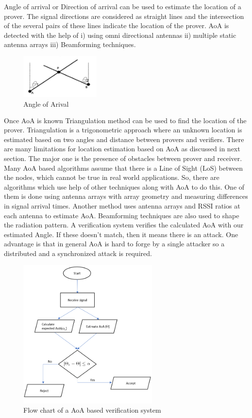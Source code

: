 Angle of arrival or Direction of arrival can be used to estimate the location of a prover. The signal directions are considered as straight lines and the intersection of the several pairs of these lines indicate the location of the prover. AoA is detected with the help of i) using omni directional antennas ii) multiple static antenna arrays iii) Beamforming techniques. 
\begin{figure}[htp]
    \centering
    \includegraphics[width=4cm]{AoA.png}
    \caption{Angle of Arival \cite{angulation}}
    \label{fig:AoA}
\end{figure}
Once AoA is known Triangulation method can be used to find the location of the prover. Triangulation is a trigonometric approach where an unknown location is estimated based on two angles and distance between provers and verifiers. There are many limitations for location estimation based on AoA as discussed in next section. The major one is the presence of obstacles between prover and receiver. Many AoA based algorithms assume that there is a Line of Sight (LoS) between the nodes, which cannot be true in real world applications. So, there are algorithms which use help of other techniques along with AoA to do this. One of them is done using antenna arrays with array geometry and measuring differences in signal arrival times. Another method uses antenna arrays and RSSI ratios at each antenna to estimate AoA. Beamforming techniques are also used to shape the radiation pattern. 
A verification system verifies the calculated AoA with our estimated Angle. If these doesn’t match, then it means there is an attack. One advantage is that in general AoA is hard to forge by a single attacker so a distributed and a synchronized attack is required.

\begin{figure}[htp]
    \centering
    \includegraphics[width=7cm]{aoa_flow.png}
    \caption{Flow chart of a AoA based verification system \cite{abdelaziz19}}
    \label{fig:aoa_flow}
\end{figure}


